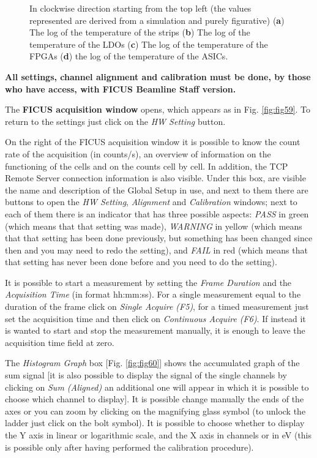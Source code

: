 \documentclass[a4paper,12pt,oneside,pdflatex,italian,final,twocolumn]{article}
\begin{document}
\begin{figure}[h]
\caption{In clockwise direction starting from the top left (the values represented are derived from a simulation and purely figurative) (\textbf{a}) The log of the temperature of the strips (\textbf{b}) The log of the temperature of the LDOs (\textbf{c}) The log of the temperature of the FPGAs (\textbf{d}) the log of the temperature of the ASICs.}\label{fig:fig58}
\end{figure}

\textbf{All settings, channel alignment and calibration must be done, by those who have access, with FICUS Beamline Staff version.}

The \textbf{FICUS acquisition window} opens, which appears as in Fig. \ref{fig:fig59}. To return to the settings just click on the \textit{HW Setting} button.



On the right of the FICUS acquisition window it is possible to know the count rate of the acquisition (in counts/s), an overview of information on the functioning of the cells and on the counts cell by cell. In addition, the TCP Remote Server connection information is also visible. Under this box, are visible the name and description of the Global Setup in use, and next to them there are buttons to open the \textit{HW Setting}, \textit{Alignment} and \textit{Calibration} windows; next to each of them there is an indicator that has three possible aspects: \textit{PASS} in green (which means that that setting was made), \textit{WARNING} in yellow (which means that that setting has been done previously, but something has been changed since then and you may need to redo the setting), and \textit{FAIL} in red (which means that that setting has never been done before and you need to do the setting).

It is possible to start a measurement by setting the \textit{Frame Duration} and the \textit{Acquisition Time} (in format hh:mm:ss). For a single measurement equal to the duration of the frame click on \textit{Single Acquire (F5)}, for a timed measurement just set the acquisition time and then click on \textit{Continuous Acquire (F6)}. If instead it is wanted to start and stop the measurement manually, it is enough to leave the acquisition time field at zero.

The \textit{Histogram Graph} box [Fig. \ref{fig:fig60}] shows the accumulated graph of the sum signal [it is also possible to display the signal of the single channels by clicking on \textit{Sum (Aligned)} an additional one will appear in which it is possible to choose which channel to display]. It is possible change manually the ends of the axes or you can zoom by clicking on the magnifying glass symbol (to unlock the ladder just click on the bolt symbol).
It is possible to choose whether to display the Y axis in linear or logarithmic scale, and the X axis in channels or in eV (this is possible only after having performed the calibration procedure).
\end{document}
